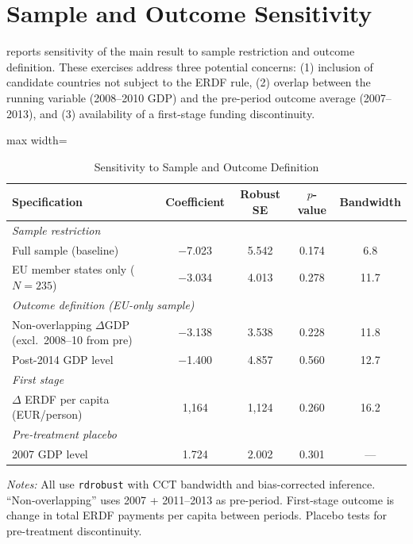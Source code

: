 \documentclass[12pt]{article}
\begin{document}
\section{Sample and Outcome Sensitivity}
\label{sec:appendix_sensitivity}

 reports sensitivity of the main result to sample restriction and outcome definition. These exercises address three potential concerns: (1) inclusion of candidate countries not subject to the ERDF rule, (2) overlap between the running variable (2008--2010 GDP) and the pre-period outcome average (2007--2013), and (3) availability of a first-stage funding discontinuity.

\begin{table}[H]
\centering
\caption{Sensitivity to Sample and Outcome Definition}
\label{tab:sensitivity}
\begin{adjustbox}{max width=\textwidth}
\begin{threeparttable}
\begin{tabular}{lcccc}
\toprule
Specification & Coefficient & Robust SE & $p$-value & Bandwidth \\
\midrule
\multicolumn{5}{l}{\textit{Sample restriction}} \\
Full sample (baseline) & $-$7.023 & 5.542 & 0.174 & 6.8 \\
EU member states only ($N = 235$) & $-$3.034 & 4.013 & 0.278 & 11.7 \\[4pt]
\multicolumn{5}{l}{\textit{Outcome definition (EU-only sample)}} \\
Non-overlapping $\Delta$GDP (excl.\ 2008--10 from pre) & $-$3.138 & 3.538 & 0.228 & 11.8 \\
Post-2014 GDP level & $-$1.400 & 4.857 & 0.560 & 12.7 \\[4pt]
\multicolumn{5}{l}{\textit{First stage}} \\
$\Delta$ ERDF per capita (EUR/person) & 1,164 & 1,124 & 0.260 & 16.2 \\[4pt]
\multicolumn{5}{l}{\textit{Pre-treatment placebo}} \\
2007 GDP level & 1.724 & 2.002 & 0.301 & --- \\
\bottomrule
\end{tabular}
\begin{tablenotes}[flushleft]\small
\item \textit{Notes:} All use \texttt{rdrobust} with CCT bandwidth and bias-corrected inference. ``Non-overlapping'' uses 2007 + 2011--2013 as pre-period. First-stage outcome is change in total ERDF payments per capita between periods. Placebo tests for pre-treatment discontinuity.
\end{tablenotes}
\end{threeparttable}
\end{adjustbox}
\end{table}
\end{document}
